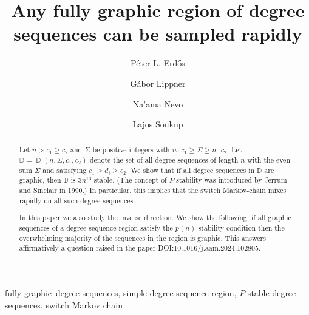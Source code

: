\documentclass[11pt]{elsarticle}
\theoremstyle{plain}
\theoremstyle{definition}
\def\mD{\mathbb{D}}
\newcommand\DOI[1]{{DOI:#1}}
\newcommand{\dds}[4]{\operatorname{\mathbb D}(#1,#2,#3,#4)}
\newcommand{\FG}{fully graphic}
\begin{document}
\begin{frontmatter}


\title{Any fully graphic region of degree sequences can be sampled rapidly}


\author[renyi]{Péter L. Erdős}
\author[NEU]{Gábor Lippner}
\author[NEU]{Na'ama Nevo}
\author[renyi]{Lajos Soukup}
\address[renyi]{HUN-REN Alfréd Rényi Institute of Mathematics, Reáltanoda u 13--15 Budapest, 1053 Hungary\\
\texttt{$<$erdos.peter,soukup.lajos$>$@renyi.hun-ren.hu}}
\address[NEU]{Northeastern University, 360 Huntington Ave, Boston, MA, 02115\\ \texttt{$<$g.lippner,nevo.n$>$@northeastern.edu}}




\begin{abstract}
Let $n>c_1\ge c_2$ and $\Sigma$ be positive integers with $n\cdot c_1\ge \Sigma \ge n\cdot c_2.$ Let  $\mD=\dds{n}{\Sigma}{c_1}{c_2}$ denote the set of all degree sequences of length $n$ with the even sum $\Sigma$ and satisfying  $c_1\ge d_i\ge c_2.$ We show that if all degree sequences in $\mD$ are graphic, then $\mD$ is $3n^{13}$-stable. (The concept of $P$-stability  was introduced by Jerrum and Sinclair in 1990.) In particular, this implies that the switch Markov-chain mixes rapidly on all such degree sequences.


In this paper we also study the inverse direction. We show the following: if all graphic sequences of a degree sequence region satisfy the $p(n)$-stability condition then the overwhelming majority of the sequences in the region is graphic. This answers affirmatively a question raised in the paper  \DOI{10.1016/j.aam.2024.102805}.
\end{abstract}
\begin{keyword}
\FG\ degree sequences, simple degree sequence region,  $P$-stable degree sequences, switch Markov chain
\end{keyword}
\end{frontmatter}
\end{document}
